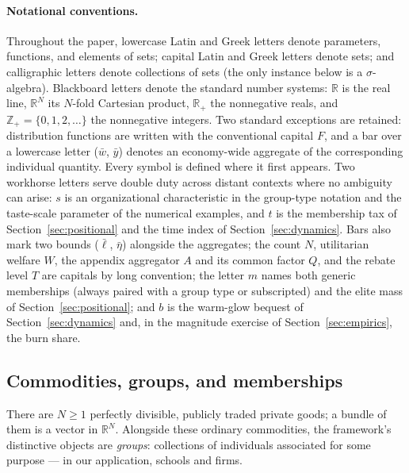 \documentclass[12pt,letterpaper]{article}
\theoremstyle{definition}
\newcommand{\R}{\mathbb{R}}
\begin{document}
\paragraph{Notational conventions.}
Throughout the paper, lowercase Latin and Greek letters denote parameters, functions, and elements of sets; capital Latin and Greek letters denote sets; and calligraphic letters denote collections of sets (the only instance below is a $\sigma$-algebra).
Blackboard letters denote the standard number systems: $\R$ is the real line, $\R^N$ its $N$-fold Cartesian product, $\R_+$ the nonnegative reals, and $\mathbb{Z}_+=\{0,1,2,\dots\}$ the nonnegative integers.
Two standard exceptions are retained: distribution functions are written with the conventional capital $F$, and a bar over a lowercase letter ($\bar{w}$, $\bar{y}$) denotes an economy-wide aggregate of the corresponding individual quantity.
Every symbol is defined where it first appears.
Two workhorse letters serve double duty across distant contexts where no ambiguity can arise: $s$ is an organizational characteristic in the group-type notation and the taste-scale parameter of the numerical examples, and $t$ is the membership tax of Section~\ref{sec:positional} and the time index of Section~\ref{sec:dynamics}.
Bars also mark two bounds ($\bar\ell$, $\bar\eta$) alongside the aggregates; the count $N$, utilitarian welfare $W$, the appendix aggregator $A$ and its common factor $Q$, and the rebate level $T$ are capitals by long convention; the letter $m$ names both generic memberships (always paired with a group type or subscripted) and the elite mass of Section~\ref{sec:positional}; and $b$ is the warm-glow bequest of Section~\ref{sec:dynamics} and, in the magnitude exercise of Section~\ref{sec:empirics}, the burn share.

\subsection{Commodities, groups, and memberships}

There are $N\geq 1$ perfectly divisible, publicly traded private goods; a bundle of them is a vector in $\R^N$.
Alongside these ordinary commodities, the framework's distinctive objects are \emph{groups}: collections of individuals associated for some purpose --- in our application, schools and firms.
\end{document}
